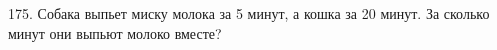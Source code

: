 175. Собака выпьет миску молока за 5 минут, а кошка за 20 минут. За сколько минут они выпьют молоко вместе?\\
